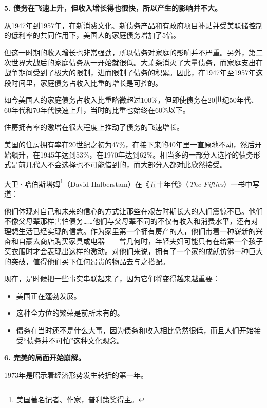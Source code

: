 \textbf{5. 债务在飞速上升，但收入增长得也很快，所以产生的影响并不大。}

从1947年到1957年，在新消费文化、新债务产品和有政府项目补贴并受美联储控制的低利率的共同作用下，美国人的家庭债务增加了5倍。

但这一时期的收入增长也非常强劲，所以债务对家庭的影响并不严重。另外，第二次世界大战后的家庭债务从一开始就很低。大萧条消灭了大量债务，而家庭支出在战争期间受到了极大的限制，进而限制了债务的积累。因此，在1947年至1957年这段时间里，家庭债务占收入比重的增长是可控的。

如今美国人的家庭债务占收入比重略微超过100\%，但即使债务在20世纪50年代、60年代和70年代快速上升，当时的比重也始终在60\%以下。

住房拥有率的激增在很大程度上推动了债务的飞速增长。

美国的住房拥有率在20世纪之初为47\%，在接下来的40年里一直原地不动，然后开始飙升，在1945年达到53\%，在1970年达到62\%。相当多的一部分人选择的债务形式是前几代人不会选择也不可能借到的，而大部分人都对此欣然接受。

大卫·哈伯斯塔姆\footnote{美国著名记者、作家，普利策奖得主。}（David Halberstam）在《五十年代》（\textit{The Fifties}）一书中写道：

{\kaishu

他们体现对自己和未来的信心的方式让那些在艰苦时期长大的人们震惊不已。他们不像父母辈那样害怕债务……他们与父母辈不同的不仅有收入和消费水平，还有对理想生活已经实现的信念。作为家里第一个拥有房产的人，他们带着一种崭新的兴奋和自豪去商店购买家具或电器——曾几何时，年轻夫妇可能只有在给第一个孩子买衣服时才会表现出这样的激动。对他们来说，拥有了一个家的成就仿佛一种巨大的突破，值得他们买下任何昂贵的物品去与之搭配。

}

现在，是时候把一些事实串联起来了，因为它们将变得越来越重要：

\begin{itemize}

\item 美国正在蓬勃发展。

\item 这种全方位的繁荣是前所未有的。

\item 债务在当时还不是什么大事，因为债务和收入相比仍然很低，而且人们开始接受“债务并不可怕”这种文化观念。

\end{itemize}

\textbf{6. 完美的局面开始崩解。}

1973年是昭示着经济形势发生转折的第一年。

